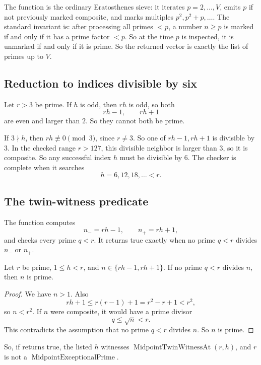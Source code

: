 The function  is the ordinary Eratosthenes sieve:
it iterates \(p=2,\ldots,V\), emits \(p\) if not previously marked composite,
and marks multiples \(p^2,p^2+p,\ldots\).  The standard invariant is:
after processing all primes \(<p\), a number \(n\ge p\) is marked if and only
if it has a prime factor \(<p\).  So at the time \(p\) is inspected, it is
unmarked if and only if it is prime.  So the returned vector is exactly
the list of primes up to \(V\).

\subsection{Reduction to indices divisible by six}

Let \(r>3\) be prime.  If \(h\) is odd, then \(rh\) is odd, so both
\[
  rh-1,\qquad rh+1
\]
are even and larger than \(2\).  So they cannot both be prime.

If \(3\nmid h\), then \(rh\not\equiv 0\pmod 3\), since \(r\ne 3\).  So one
of \(rh-1,rh+1\) is divisible by \(3\).  In the checked range \(r>127\), this
divisible neighbor is larger than \(3\), so it is composite.  So any
successful index \(h\) must be divisible by \(6\).  The checker is complete
when it searches
\[
  h=6,12,18,\ldots < r.
\]

\subsection{The twin-witness predicate}

The function  computes
\[
  n_- = rh-1,\qquad n_+=rh+1,
\]
and checks every prime \(q<r\).  It returns true exactly when no prime
\(q<r\) divides \(n_-\) or \(n_+\).

\begin{lemma}
Let \(r\) be prime, \(1\le h<r\), and \(n\in\{rh-1,rh+1\}\).  If no prime
\(q<r\) divides \(n\), then \(n\) is prime.
\end{lemma}

\begin{proof}
We have \(n>1\).  Also
\[
  rh+1\le r(r-1)+1=r^2-r+1<r^2,
\]
so \(n<r^2\).  If \(n\) were composite, it would have a prime divisor
\[
  q\le \sqrt n<r.
\]
This contradicts the assumption that no prime \(q<r\) divides \(n\).  So
\(n\) is prime.
\end{proof}

So, if  returns true, the listed \(h\)
witnesses \(\operatorname{MidpointTwinWitnessAt}(r,h)\), and \(r\) is not a
\(\operatorname{MidpointExceptionalPrime}\).

